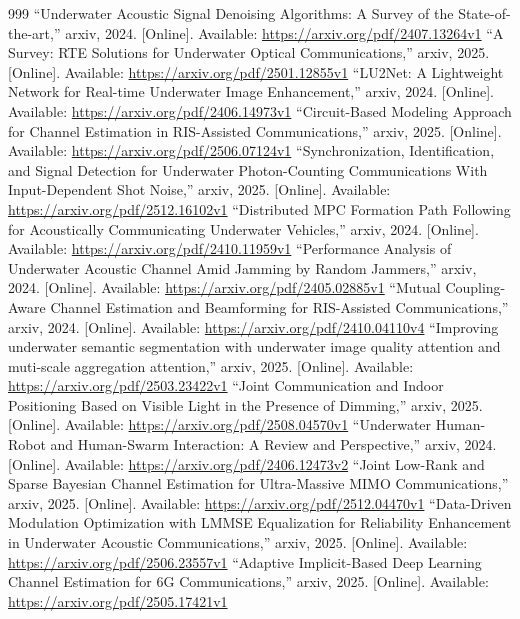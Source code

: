 \documentclass[10pt,journal]{IEEEtran}
\begin{document}
\begin{thebibliography}{999}
 ``Underwater Acoustic Signal Denoising Algorithms: A Survey of the State-of-the-art,'' arxiv, 2024. [Online]. Available: \url{https://arxiv.org/pdf/2407.13264v1}
 ``A Survey: RTE Solutions for Underwater Optical Communications,'' arxiv, 2025. [Online]. Available: \url{https://arxiv.org/pdf/2501.12855v1}
 ``LU2Net: A Lightweight Network for Real-time Underwater Image Enhancement,'' arxiv, 2024. [Online]. Available: \url{https://arxiv.org/pdf/2406.14973v1}
 ``Circuit-Based Modeling Approach for Channel Estimation in RIS-Assisted Communications,'' arxiv, 2025. [Online]. Available: \url{https://arxiv.org/pdf/2506.07124v1}
 ``Synchronization, Identification, and Signal Detection for Underwater Photon-Counting Communications With Input-Dependent Shot Noise,'' arxiv, 2025. [Online]. Available: \url{https://arxiv.org/pdf/2512.16102v1}
 ``Distributed MPC Formation Path Following for Acoustically Communicating Underwater Vehicles,'' arxiv, 2024. [Online]. Available: \url{https://arxiv.org/pdf/2410.11959v1}
 ``Performance Analysis of Underwater Acoustic Channel Amid Jamming by Random Jammers,'' arxiv, 2024. [Online]. Available: \url{https://arxiv.org/pdf/2405.02885v1}
 ``Mutual Coupling-Aware Channel Estimation and Beamforming for RIS-Assisted Communications,'' arxiv, 2024. [Online]. Available: \url{https://arxiv.org/pdf/2410.04110v4}
 ``Improving underwater semantic segmentation with underwater image quality attention and muti-scale aggregation attention,'' arxiv, 2025. [Online]. Available: \url{https://arxiv.org/pdf/2503.23422v1}
 ``Joint Communication and Indoor Positioning Based on Visible Light in the Presence of Dimming,'' arxiv, 2025. [Online]. Available: \url{https://arxiv.org/pdf/2508.04570v1}
 ``Underwater Human-Robot and Human-Swarm Interaction: A Review and Perspective,'' arxiv, 2024. [Online]. Available: \url{https://arxiv.org/pdf/2406.12473v2}
 ``Joint Low-Rank and Sparse Bayesian Channel Estimation for Ultra-Massive MIMO Communications,'' arxiv, 2025. [Online]. Available: \url{https://arxiv.org/pdf/2512.04470v1}
 ``Data-Driven Modulation Optimization with LMMSE Equalization for Reliability Enhancement in Underwater Acoustic Communications,'' arxiv, 2025. [Online]. Available: \url{https://arxiv.org/pdf/2506.23557v1}
 ``Adaptive Implicit-Based Deep Learning Channel Estimation for 6G Communications,'' arxiv, 2025. [Online]. Available: \url{https://arxiv.org/pdf/2505.17421v1}

\end{thebibliography}
\end{document}
